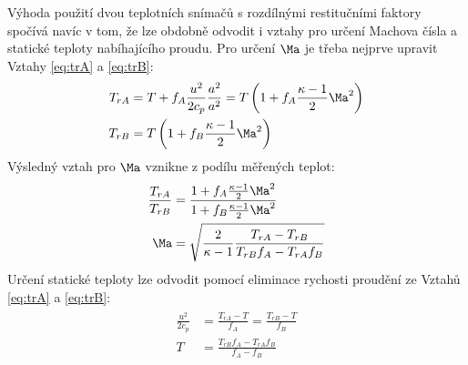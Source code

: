         Výhoda použití dvou teplotních snímačů s rozdílnými restitučními faktory spočívá navíc v tom, že lze obdobně odvodit i vztahy pro určení Machova čísla a statické teploty nabíhajícího proudu. Pro určení $\Ma$ je třeba nejprve upravit Vztahy \ref{eq:trA} a \ref{eq:trB}:
        \begin{align}
            \begin{split}
                T_{rA} &= T + f_A \frac{u^2}{2 c_p} \frac{a^2}{a^2} = T \brac{1 + f_A \frac{\kappa - 1}{2} \Ma ^2} \\
                T_{rB} &=  T \brac{1 + f_B \frac{\kappa - 1}{2} \Ma ^2}
            \end{split}
        \end{align}
        \noindent Výsledný vztah pro $\Ma$ vznikne z podílu měřených teplot:
        \begin{align}
            \begin{split}
                \frac{T_{rA}}{T_{rB}} &= \frac{1 + f_A \frac{\kappa - 1}{2} \Ma ^2}{1 + f_B \frac{\kappa - 1}{2} \Ma ^2} \\
                \Ma &= \sqrt{\frac{2}{\kappa - 1} \frac{T_{rA}-T_{rB}}{T_{rB} f_A - T_{rA} f_B}}
            \end{split}
        \end{align}
        \noindent Určení statické teploty lze odvodit pomocí eliminace rychosti proudění ze Vztahů \ref{eq:trA} a \ref{eq:trB}:
        \begin{align}
            \begin{split}
                \frac{u^2}{2 c_p} &= \frac{T_{rA} - T}{f_A} = \frac{T_{rB} - T}{f_B} \\
                T &= \frac{T_{rB} f_A - T_{rA} f_B}{f_A - f_B}
            \end{split}
        \end{align}

        

        \vspace{10cm}

